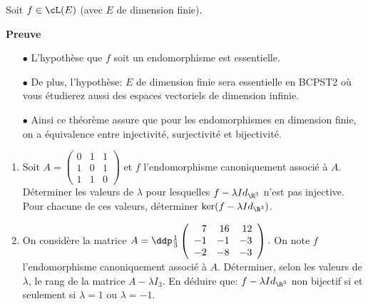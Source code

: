 \documentclass[a4paper, 11pt]{article}
\begin{document}
\begin{prop} Soit $f\in\cL(E)$ (avec $E$ de dimension finie).
\vspace{1cm}
\end{prop}

\textbf{Preuve}

\vspace{5cm}


\begin{rems}
\begin{itemize}
\item[$\bullet$]  \warning  L'hypoth\`{e}se que $f$ soit un endomorphisme est essentielle.
\item[$\bullet$] De plus, l'hypoth\`{e}se: $E$ de dimension finie sera essentielle en BCPST2 o\`{u} vous \'etudierez aussi des espaces vectoriels de dimension infinie.
\item[$\bullet$] Ainsi ce th\'eor\`{e}me assure que pour les endomorphismes en dimension finie, on a \'equivalence entre injectivit\'e, surjectivit\'e et bijectivit\'e.
\end{itemize}
\end{rems}

{\footnotesize \begin{exercice}
\begin{enumerate}
\item Soit $A=\left(\begin{array}{lll}  0&1&1\\ 1&0&1\\ 1&1&0 \end{array}\right)$ et $f$ l'endomorphisme canoniquement associ\'e \`a $A$. D\'eterminer les valeurs de $\lambda$ pour lesquelles $f-\lambda Id_{\R^3}$ n'est pas injective. Pour chacune de ces valeurs, d\'eterminer $\ker (f-\lambda Id_{\R^3})$.
\item On consid\`ere la matrice $A=\ddp\frac{1}{3}\left(\begin{array}{rrr} 7&16&12\\-1&-1&-3 \\-2&-8&-3  \end{array}\right).$ On note $f$ l'endomorphisme canoniquement associ\'e \`a $A$. D\'eterminer, selon les valeurs de $\lambda$, le rang de la matrice $A-\lambda I_3$. En d\'eduire que: $f-\lambda Id_{\R^3}$ non bijectif si et seulement si $\lambda=1$ ou $\lambda=-1$. 
\end{enumerate}
\end{exercice}
}
\end{document}
